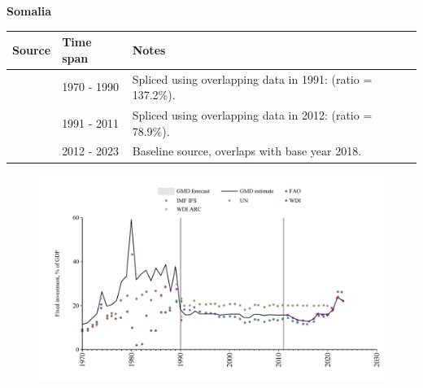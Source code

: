 \documentclass[12pt,a4paper,landscape]{article}
\begin{document}
\begin{adjustbox}{max totalsize={\paperwidth}{\paperheight},center}
\begin{minipage}[t][\textheight][t]{\textwidth}
\vspace*{0.5cm}
{}
\begin{center}
{\Large\bfseries Somalia}
\end{center}
\vspace{0.5cm}
\begin{table}[H]
\centering
\small
\begin{tabular}{|l|l|l|}
\hline
\textbf{Source} & \textbf{Time span} & \textbf{Notes} \\
\hline
\rowcolor{white}\cite{WDI}& 1970 - 1990 &Spliced using overlapping data in 1991: (ratio = 137.2\%).\\
\rowcolor{lightgray}\cite{UN}& 1991 - 2011 &Spliced using overlapping data in 2012: (ratio = 78.9\%).\\
\rowcolor{white}\cite{WDI}& 2012 - 2023 &Baseline source, overlaps with base year 2018.\\
\hline
\end{tabular}
\end{table}
\begin{figure}[H]
\centering
\includegraphics[width=\textwidth,height=0.6\textheight,keepaspectratio]{graphs/SOM_finv_GDP.pdf}
\end{figure}
\end{minipage}
\end{adjustbox}
\end{document}
